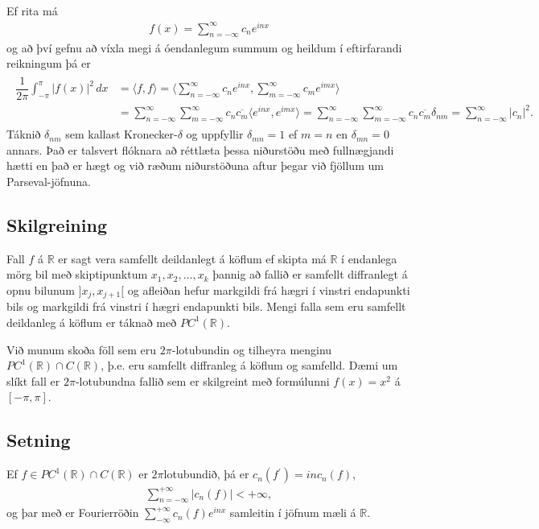 \documentclass[a4paper,10pt,icelandic]{sphinxmanual}
\begin{document}
Ef rita má
\begin{equation*}
\begin{split}f(x) = \sum_{n=-\infty}^\infty c_n e^{inx}\end{split}
\end{equation*}
og að því gefnu að víxla megi á óendanlegum summum og heildum í eftirfarandi reikningum þá er
\begin{equation*}
\begin{split}\begin {align*}
 \dfrac
1{2\pi}\int_{-\pi}^\pi |f(x)|^2\, dx &= \langle f, f\rangle = \langle \sum_{n=-\infty}^\infty c_n e^{inx}, \sum_{m=-\infty}^\infty c_m e^{imx}\rangle \\
&= \sum_{n=-\infty}^\infty \sum_{m=-\infty}^\infty c_n \overline{c_m} \langle  e^{inx},  e^{imx}\rangle = \sum_{n=-\infty}^\infty \sum_{m=-\infty}^\infty c_n \overline{c_m} \delta_{nm} = \sum_{n=-\infty}^\infty |c_n|^2.
 \end{align*}\end{split}
\end{equation*}
Táknið \(\delta_{nm}\) sem kallast Kronecker-\(\delta\) og uppfyllir \(\delta_{mn} = 1\) ef \(m=n\) en \(\delta_{mn}=0\) annars. Það er talsvert flóknara að réttlæta þessa niðurstöðu með fullnægjandi hætti en það er hægt og við ræðum niðurstöðuna aftur þegar við fjöllum um Parseval-jöfnuna.


\subsection{Skilgreining}
\label{\detokenize{Kafli02:id5}}
Fall \(f\) á \(\mathbb{R}\) er sagt vera samfellt deildanlegt á köflum ef skipta má \(\mathbb{R}\) í endanlega mörg bil með skiptipunktum \(x_1,x_2,\ldots, x_k\) þannig að fallið er samfellt diffranlegt á opnu bilunum \(]x_j,x_{j+1}[\) og afleiðan hefur markgildi frá hægri í vinstri endapunkti bils og markgildi frá vinstri í hægri endapunkti bils. Mengi falla sem eru samfellt deildanleg á köflum er táknað með \(PC^1(\mathbb{R})\).

Við munum skoða föll sem eru \(2\pi\)-lotubundin og tilheyra menginu \(PC^1(\mathbb{R})\cap C(\mathbb{R})\), þ.e. eru samfellt diffranleg á köflum og samfelld. Dæmi um slíkt fall er \(2\pi\)-lotubundna fallið sem er skilgreint með formúlunni \(f(x) = x^2\) á \([-\pi,\pi]\).


\subsection{Setning}
\label{\detokenize{Kafli02:setning}}
Ef \(f\in PC^1({{\mathbb  R}})\cap C({{\mathbb  R}})\) er
\(2\pi\)\textendash{}lotubundið, þá er \(c_n(f{{^{\prime}}})=inc_n(f)\),
\begin{equation*}
\begin{split}\sum\limits_{n=-\infty}^{+\infty} |c_n(f)|< +\infty,\end{split}
\end{equation*}
og þar með er Fourier\textendash{}röðin
\(\sum_{-\infty}^{+\infty}c_n(f)e^{inx}\) samleitin í jöfnum mæli á
\({{\mathbb  R}}\).
\end{document}
